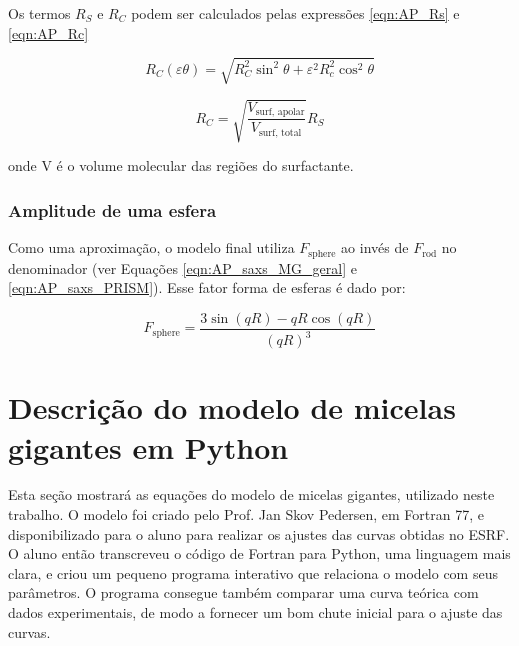 \begin{apendicesenv}
Os termos \(R_S\) e \(R_C\) podem ser calculados pelas expressões \ref{eqn:AP_Rs} e \ref{eqn:AP_Rc}

\begin{equation}
R_C(\varepsilon\theta) = \sqrt{R_C^2\sin^2\theta + \varepsilon^2R_c^2\cos^2\theta}
\label{eqn:AP_Rc}
\end{equation}

\begin{equation}
R_C = \sqrt{\frac{V_{\textrm{surf, apolar}}}{V_{\textrm{surf, total}}}}R_S
\label{eqn:AP_Rs}
\end{equation}

\noindent onde V é o volume molecular das regiões do surfactante.

\subsection{Amplitude de uma esfera}
Como uma aproximação, o modelo final utiliza \(F_{\mathrm{sphere}}\) ao invés de \(F_{\mathrm{rod}}\) no denominador (ver Equações \ref{eqn:AP_saxs_MG_geral} e \ref{eqn:AP_saxs_PRISM}). Esse fator forma de esferas é dado por:

\begin{equation}
	F_{\textrm{sphere}} = \dfrac{3\sin(qR) - qR\cos(qR)}{(qR)^3}
	\label{eqn:AP_Fsphere}
\end{equation}


\chapter{Descrição do modelo de micelas gigantes em Python}
\label{sec:modelo_MG_python}
Esta seção mostrará as equações do modelo de micelas gigantes, utilizado neste trabalho. O modelo foi criado pelo Prof. Jan Skov Pedersen, em Fortran 77, e disponibilizado para o aluno para realizar os ajustes das curvas obtidas no ESRF. O aluno então transcreveu o código de Fortran para Python, uma linguagem mais clara, e criou um pequeno programa interativo que relaciona o modelo com seus parâmetros. O programa consegue também comparar uma curva teórica com dados experimentais, de modo a fornecer um bom chute inicial para o ajuste das curvas.


\end{apendicesenv}
